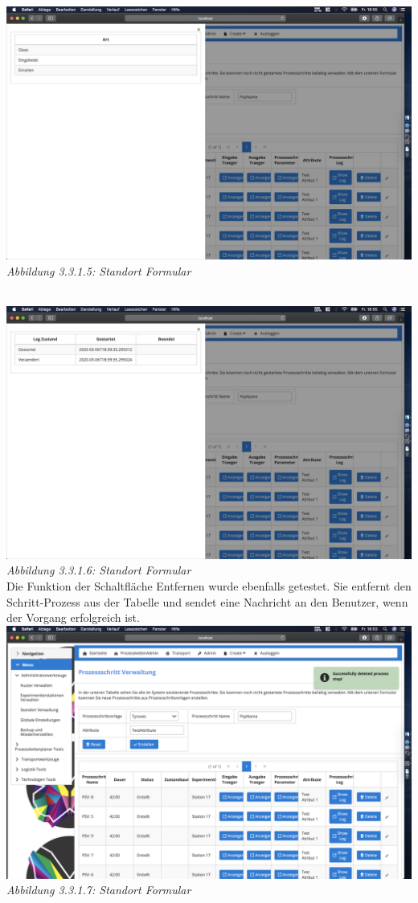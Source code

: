 \documentclass[enabledeprecatedfontcommands,fontsize=12pt,paper=a4,twoside]{scrartcl}
\begin{document}
\hypertarget{sc3.3.1.5}{
\includegraphics[width=1\textwidth]{Screenshots/33log.png}
\textit{Abbildung 3.3.1.5: Standort Formular}
} \\
\hypertarget{sc3.3.1.6}{
\includegraphics[width=1\textwidth]{Screenshots/33log2.png}
\textit{Abbildung 3.3.1.6: Standort Formular}
} \\
Die Funktion der Schaltfläche Entfernen wurde ebenfalls getestet. Sie entfernt den Schritt-Prozess aus der Tabelle und sendet eine Nachricht an den Benutzer, wenn der Vorgang erfolgreich ist.\\
\hypertarget{sc3.3.1.7}{
\includegraphics[width=1\textwidth]{Screenshots/33removepsp.png}
\textit{Abbildung 3.3.1.7: Standort Formular}
} \\
\end{document}
